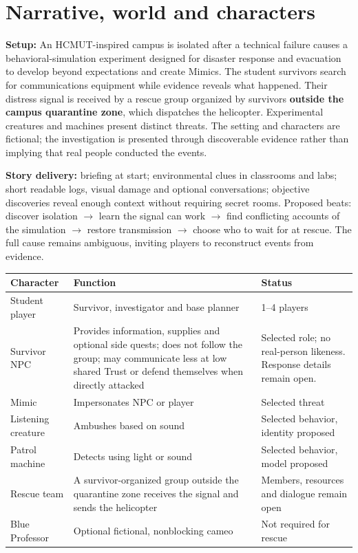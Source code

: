 \section{Narrative, world and characters}
\textbf{Setup:} An HCMUT-inspired campus is isolated after a technical failure causes a behavioral-simulation experiment designed for disaster response and evacuation to develop beyond expectations and create Mimics. The student survivors search for communications equipment while evidence reveals what happened. Their distress signal is received by a rescue group organized by survivors \textbf{outside the campus quarantine zone}, which dispatches the helicopter. Experimental creatures and machines present distinct threats. The setting and characters are fictional; the investigation is presented through discoverable evidence rather than implying that real people conducted the events.

\textbf{Story delivery:} briefing at start; environmental clues in classrooms and labs; short readable logs, visual damage and optional conversations; objective discoveries reveal enough context without requiring secret rooms. Proposed beats: discover isolation  $\rightarrow$  learn the signal can work  $\rightarrow$  find conflicting accounts of the simulation  $\rightarrow$  restore transmission  $\rightarrow$  choose who to wait for at rescue. The full cause remains ambiguous, inviting players to reconstruct events from evidence.

\begin{longtable}{@{}p{}p{}p{}@{}}
\toprule
\textbf{Character} & \textbf{Function} & \textbf{Status} \\ \midrule\endhead
Student player & Survivor, investigator and base planner & 1--4 players \\
Survivor NPC & Provides information, supplies and optional side quests; does not follow the group; may communicate less at low shared Trust or defend themselves when directly attacked & Selected role; no real-person likeness. Response details remain open. \\
Mimic & Impersonates NPC or player & Selected threat \\
Listening creature & Ambushes based on sound & Selected behavior, identity proposed \\
Patrol machine & Detects using light or sound & Selected behavior, model proposed \\
Rescue team & A survivor-organized group outside the quarantine zone receives the signal and sends the helicopter & Members, resources and dialogue remain open \\
Blue Professor & Optional fictional, nonblocking cameo & Not required for rescue \\
\bottomrule
\end{longtable}

